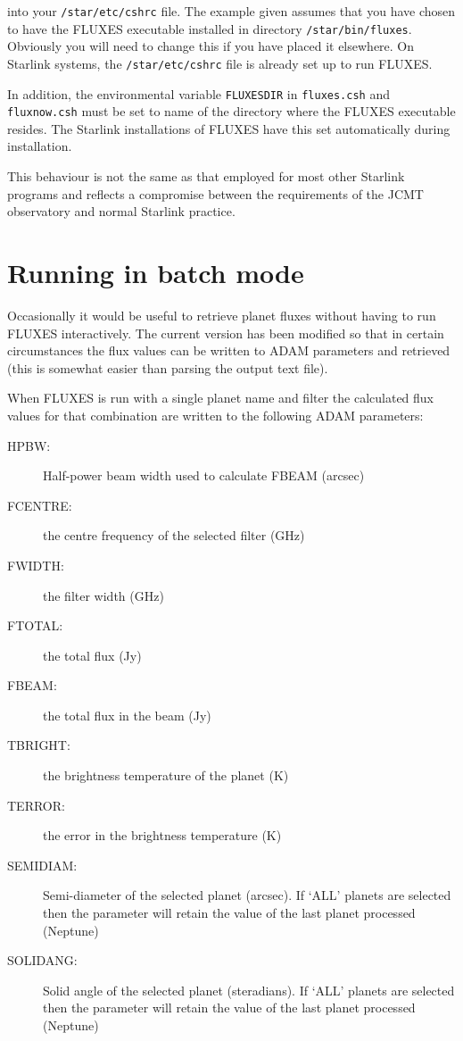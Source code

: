 \documentclass[11pt,twoside]{article}
\newcommand{\xlabel}[1]{}
\renewcommand{\_}{\texttt{\symbol{95}}}
\begin{document}
into your {\tt{/star/etc/cshrc}} file.  The example given assumes that
you have chosen to have the FLUXES executable installed in directory
{\tt{/star/bin/fluxes}}.  Obviously you will need to change this if you
have placed it elsewhere.   On Starlink systems, the
{\tt{/star/etc/cshrc}} file is already set up to run FLUXES.

In addition, the environmental variable {\tt{FLUXES\_DIR}} in {\tt{fluxes.csh}}
and {\tt{fluxnow.csh}} must be set to name of the directory where the FLUXES
executable resides.  The Starlink installations of FLUXES have this set
automatically during installation.

This behaviour is not the same as that employed for most other Starlink
programs and reflects a compromise between the requirements of the JCMT
observatory and normal Starlink practice.


\section{Running in batch mode}
\xlabel{batch_mode}
\label{sec:batchmode}

Occasionally it would be useful to retrieve planet fluxes without having
to run FLUXES interactively. The current version has been modified so that
in certain circumstances the flux values can be written to ADAM parameters
and retrieved (this is somewhat easier than parsing the output text file).

When FLUXES is run with a single planet name and filter the calculated
flux values for that combination are written to the following
ADAM parameters:

\begin{description}
\item[HPBW:] Half-power beam width used to calculate F\_BEAM (arcsec)
\item[F\_CENTRE:] the centre frequency of the selected filter (GHz)
\item[F\_WIDTH:] the filter width (GHz)
\item[F\_TOTAL:] the total flux (Jy)
\item[F\_BEAM:] the total flux in the beam (Jy)
\item[T\_BRIGHT:] the brightness temperature of the planet (K)
\item[T\_ERROR:] the error in the brightness temperature (K)
\item[SEMI\_DIAM:] Semi-diameter of the selected planet (arcsec).
If `ALL' planets are selected then the parameter will retain the
value of the last planet processed (Neptune)
\item[SOLID\_ANG:] Solid angle of the selected planet (steradians).
If `ALL' planets are selected then the parameter will retain the
value of the last planet processed (Neptune)
\end{description}
\end{document}
